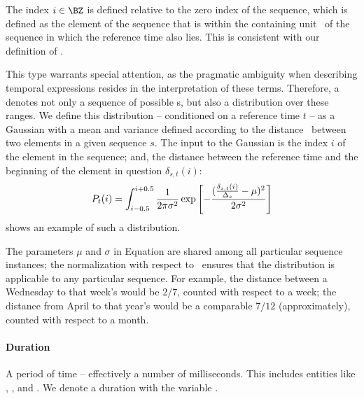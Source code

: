 The index $i \in \BZ$ is defined relative to the zero index of the sequence,
	which is defined as the element of the sequence
	that is within the containing unit \seqcanon\ of the sequence in which the 
	reference time also lies.
This is consistent with our definition of \seqelem.

This type warrants special attention, as the pragmatic ambiguity when
	describing temporal expressions resides in the interpretation of these
	terms.
Therefore, a  denotes not only a sequence of possible
	s, but also a distribution over these ranges.
We define this distribution -- conditioned on a reference time $t$ --
	as a Gaussian with a mean and variance defined according
	to the distance \seqjump\ between two elements in a given sequence $s$.
The input to the Gaussian is the index $i$ of the element in the sequence;
	and, the distance between the reference time and the beginning
	of the element in question $\delta_{s,t}(i)$:
\begin{equation}
\label{eqn:gaussian}
	P_t(i) = 
	\int_{i-0.5}^{i+0.5}
		\frac{1}{2\pi\sigma^2} 
			\exp\left[-\frac{
					(\frac{\delta_{s,t}(i)}{\Delta_s} - \mu)^2
				}{
					2\sigma^2
				}
			\right]
\end{equation}
 shows an example of such a distribution.

The parameters $\mu$ and $\sigma$ in Equation  are shared
	among all particular sequence instances; the normalization
	with respect to \seqjump\ ensures that the distribution is applicable
	to any particular sequence.
For example, the distance between a Wednesday to that week's 
	would be $2/7$, counted with respect to a week; 
	the distance from April to that year's  would be a 
	comparable $7/12$ (approximately), counted with respect to a month.
	
\paragraph{Duration}
A period of time -- effectively a number of milliseconds.
This includes entities like , , and .
We denote a duration with the variable \dur.

